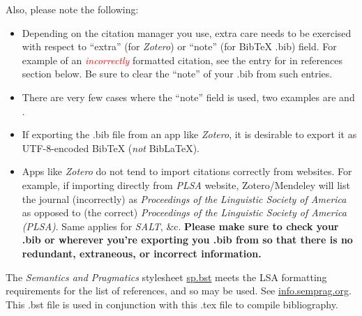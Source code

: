 \documentclass[12pt,letterpaper]{article}
\begin{document}
Also, please note the following:
\begin{itemize}
    \item Depending on the citation manager you use, extra care needs to be exercised with respect to ``extra'' (for \textit{Zotero}) or ``note'' (for BibTeX .bib) field. For example of an \textcolor{red}{\textit{incorrectly}} formatted citation, see the entry for \cite{sankoff_formal_1981} in references section below. Be sure to clear the ``note'' of your .bib from such entries.
    \item There are very few cases where the ``note'' field is used, two examples are \cite{ozernyi_linguistic_2022} and \cite{ozernyi_rise_2022}. 
    \item If exporting the .bib file from an app like \textit{Zotero}, it is desirable to export it as UTF-8-encoded BibTeX (\textit{not} BibLaTeX).
    \item Apps like \textit{Zotero} do not tend to import citations correctly from websites. For example, if importing directly from \textit{PLSA} website, Zotero/Mendeley will list the journal (incorrectly) as \textit{Proceedings of the Linguistic Society of America} as opposed to (the correct) \textit{Proceedings of the Linguistic Society of America (PLSA)}. Same applies for \textit{SALT}, \&c. \textbf{Please make sure to check your .bib or wherever you're exporting you .bib from so that there is no redundant, extraneous, or incorrect information.} 
\end{itemize}

The \textit{Semantics and Pragmatics} stylesheet \href{https://raw.githubusercontent.com/semprag/tex/master/sp.bst}{sp.bst} meets the LSA formatting requirements for the list of references, and so may be used. See \href{http://info.semprag.org}{info.semprag.org}. This .bst file is used in conjunction with this .tex file to compile bibliography.  

\setlength{\bibsep}{0pt plus 0.3ex}
\setlength{\bibhang}{0.3in}	%
\titleformat{\section}{\normalfont\bfseries}{\thesection}{.5em}{} %

\newcommand{\doi}[1]{\href{https://doi.org/#1}{https://doi.org/#1}} %
\end{document}
